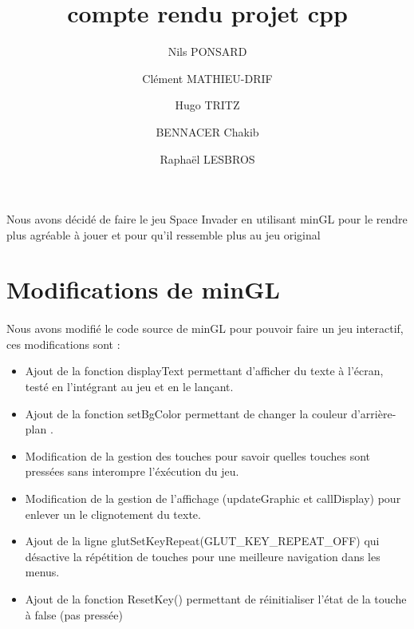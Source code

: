 \documentclass{article}
\begin{document}
\author{Nils PONSARD \and Clément MATHIEU-DRIF \and
Hugo TRITZ \and BENNACER Chakib \and
Raphaël LESBROS}
\title{compte rendu projet cpp}
\maketitle
\paragraph{} Nous avons décidé de faire le jeu Space Invader en utilisant minGL pour le rendre plus agréable à jouer et pour qu'il ressemble plus au jeu original
\section{Modifications de minGL}
\paragraph{} Nous avons modifié le code source de minGL pour pouvoir faire un jeu interactif, ces modifications sont :
\begin{itemize}
    \item Ajout de la fonction displayText permettant d'afficher du texte à l'écran, testé en l'intégrant au jeu et en le lançant.
    \item Ajout de la fonction setBgColor permettant de changer la couleur d'arrière-plan .
    \item Modification de la gestion des touches pour savoir quelles touches sont pressées sans interompre l'éxécution du jeu.
    \item Modification de la gestion de l'affichage (updateGraphic et callDisplay) pour enlever un le clignotement du texte.
    \item Ajout de la ligne glutSetKeyRepeat(GLUT\_KEY\_REPEAT\_OFF) qui désactive la répétition de touches pour une meilleure navigation dans les menus.
    \item Ajout de la fonction ResetKey() permettant de réinitialiser l'état de la touche à false (pas pressée)
\end{itemize}
\end{document}
